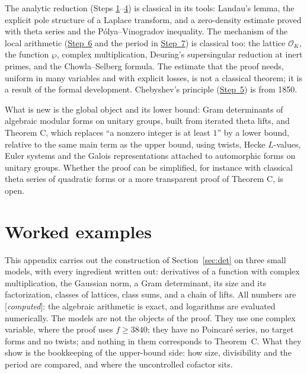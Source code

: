 \documentclass[11pt]{amsart}
\numberwithin{equation}{section}
\theoremstyle{definition}
\theoremstyle{remark}
\newcommand{\cO}{\mathcal O}
\newcommand{\status}[1]{\textup{[\emph{#1}]}}
\begin{document}
The analytic reduction (Steps \hyperref[step:1]{1}--\hyperref[step:4]{4}) is classical in its tools: Landau's lemma, the explicit pole structure of a Laplace transform, and a zero-density estimate proved with theta series and the P\'olya--Vinogradov inequality. The mechanism of the local arithmetic (\hyperref[step:6]{Step~6} and the period in \hyperref[step:7]{Step~7}) is classical too: the lattice $\cO_K$, the function $\wp$, complex multiplication, Deuring's supersingular reduction at inert primes, and the Chowla--Selberg formula. The estimate that the proof needs, uniform in many variables and with explicit losses, is not a classical theorem; it is a result of the formal development. Chebyshev's principle (\hyperref[step:5]{Step~5}) is from 1850.

What is new is the global object and its lower bound: Gram determinants of algebraic modular forms on unitary groups, built from iterated theta lifts, and Theorem C, which replaces ``a nonzero integer is at least $1$'' by a lower bound, relative to the same main term as the upper bound, using twists, Hecke $L$-values, Euler systems and the Galois representations attached to automorphic forms on unitary groups. Whether the proof can be simplified, for instance with classical theta series of quadratic forms or a more transparent proof of Theorem C, is open.

\appendix
\section{Worked examples}\label{sec:examples}

This appendix carries out the construction of Section~\ref{sec:det} on three small models, with every ingredient written out: derivatives of a function with complex multiplication, the Gaussian norm, a Gram determinant, its size and its factorization, classes of lattices, class sums, and a chain of lifts. All numbers are \status{computed}: the algebraic arithmetic is exact, and logarithms are evaluated numerically. The models are not the objects of the proof. They use one complex variable, where the proof uses $f\ge3840$; they have no Poincar\'e series, no target forms and no twists; and nothing in them corresponds to Theorem~C. What they show is the bookkeeping of the upper-bound side: how size, divisibility and the period are compared, and where the uncontrolled cofactor sits.
\end{document}
